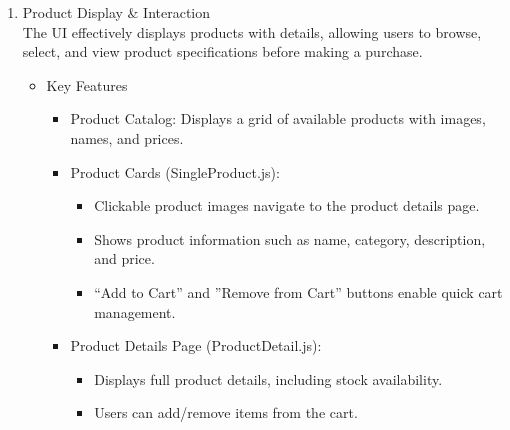 \documentclass{llncs}
\begin{document}
\begin{enumerate}
        \item Product Display \& Interaction \\
        The UI effectively displays products with details, allowing users to browse, select, and view product specifications before making a purchase.
            \begin{itemize}
                \item Key Features 
                \begin{itemize}
                    \item Product Catalog: Displays a grid of available products with images, names, and prices.
                    \item Product Cards (SingleProduct.js):
                    \begin{itemize}
                        \item Clickable product images navigate to the product details page.
                        \item Shows product information such as name, category, description, and price.
                        \item ``Add to Cart'' and ''Remove from Cart'' buttons enable quick cart management.
                    \end{itemize}
                    \item Product Details Page (ProductDetail.js):
                    \begin{itemize}
                        \item Displays full product details, including stock availability.
                        \item Users can add/remove items from the cart.\\
    
                    \end{itemize}
                \end{itemize}
            \end{itemize}


\end{enumerate}
\end{document}
